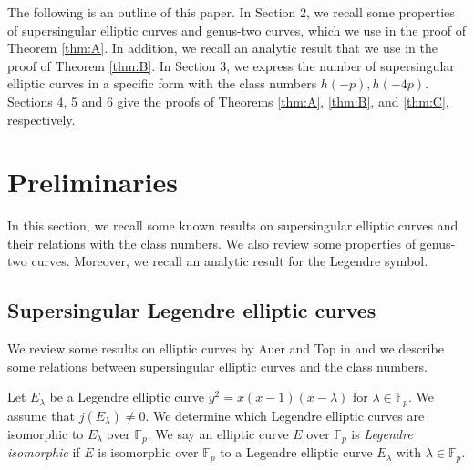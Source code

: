 \documentclass[a4paper, 11pt]{article}
\theoremstyle{plain}
\newcommand{\?}{\textcolor{red}{??}}
\newcommand{\lm}{\lambda}
\newcommand{\fp}{\mathbb{F}_p}
\begin{document}
The following is an outline of this paper. In Section 2, we recall some properties of supersingular elliptic curves and genus-two curves, which we use in the proof of Theorem \ref{thm:A}. In addition, we recall an analytic result that we use in the proof of Theorem \ref{thm:B}. In Section 3, we express the number of supersingular elliptic curves in a specific form with the class numbers $h(-p),h(-4p)$. Sections 4, 5 and 6 give the proofs of Theorems \ref{thm:A}, \ref{thm:B}, and \ref{thm:C}, respectively. 


\section{Preliminaries}
In this section, we recall some known results on supersingular elliptic curves and  their relations with the class numbers. We also review some properties of genus-two curves. Moreover, we recall an analytic result for the Legendre symbol.
  \subsection{Supersingular Legendre elliptic curves}\label{subsec:2.1}
  We review some results on elliptic curves by Auer and Top in \cite{AT02} and we describe some relations between supersingular elliptic curves and the class numbers.

  Let $E_{\lm}$ %
  be a Legendre elliptic curve $y^2=x(x-1)(x-\lm)$ for $\lambda\in\fp$.
  We assume that $j(E_{\lm}) \ne 0$.
  We determine which Legendre elliptic curves are isomorphic to $E_{\lm}$ over $\fp$. 
  We say an elliptic curve $E$ over $\fp$ is \textit{Legendre isomorphic} if $E$ is isomorphic over $\fp$ to a Legendre elliptic curve $E_{\lm}$ with $\lm \in \fp$. %
 
\end{document}
